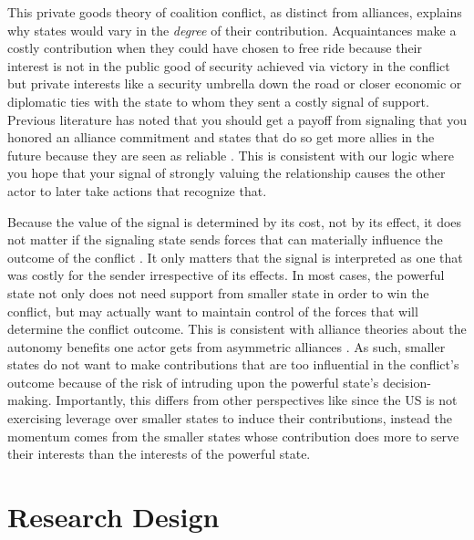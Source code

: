 \documentclass[12pt,letterpaper]{article}
\begin{document}
		This private goods theory of coalition conflict, as distinct from alliances, explains why states would vary in the \textit{degree} of their contribution. Acquaintances make a costly contribution when they could have chosen to free ride because their interest is not in the public good of security achieved via victory in the conflict but private interests like a security umbrella down the road or closer economic or diplomatic ties with the state to whom they sent a costly signal of support. Previous literature has noted that you should get a payoff from signaling that you honored an alliance commitment and states that do so get more allies in the future because they are seen as reliable \citep{gibler_costsrenegingreputation_2008}. This is consistent with our logic where you hope that your signal of strongly valuing the relationship causes the other actor to later take actions that recognize that.

		Because the value of the signal is determined by its cost, not by its effect, it does not matter if the signaling state sends forces that can materially influence the outcome of the conflict \citep{davidson_americaallieswar_2011}. It only matters that the signal is interpreted as one that was costly for the sender irrespective of its effects. In most cases, the powerful state not only does not need support from smaller state in order to win the conflict, but may actually want to maintain control of the forces that will determine the conflict outcome. This is consistent with alliance theories about the autonomy benefits one actor gets from asymmetric alliances \citep{morrow_alliancesasymmetryalternative_1991}. As such, smaller states do not want to make contributions that are too influential in the conflict's outcome because of the risk of intruding upon the powerful state's decision-making. Importantly, this differs from other perspectives like \citet{bennett_burdensharingpersiangulf_1994} since the US is not exercising leverage over smaller states to induce their contributions, instead the momentum comes from the smaller states whose contribution does more to serve their interests than the interests of the powerful state.

\section{Research Design}
\end{document}
